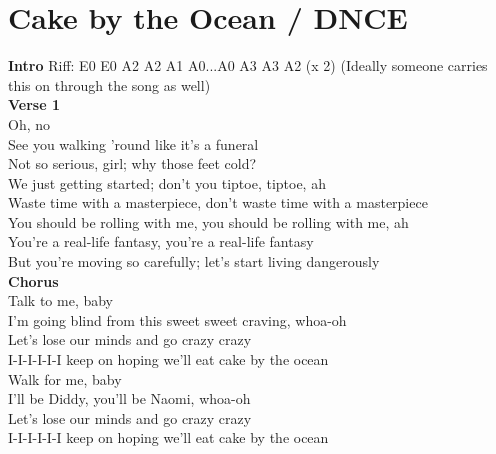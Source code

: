 \section{Cake by the Ocean / DNCE}\label{sec:cakebytheocean}

\Eminor
\Bminor
\Amajor
\Cmajor

\textbf{Intro} Riff: E0 E0 A2 A2 A1 A0...A0 A3 A3 A2 (x 2) (Ideally someone carries this on through the song as well)\\
\textbf{Verse 1}\\
Oh, no\\
See you walking 'round like it's a funeral\\
Not so serious, girl; why those feet cold?\\
We just getting started; don't you tiptoe, tiptoe, ah\\
Waste time with a masterpiece, don't waste time with a masterpiece\\
You should be rolling with me, you should be rolling with me, ah\\
You're a real-life fantasy, you're a real-life fantasy\\       
But you're moving so carefully; let's start living dangerously\\
\textbf{Chorus}\\
Talk to me, baby\\
I'm going blind from this sweet sweet craving, whoa-oh\\
Let's lose our minds and go crazy crazy\\
I-I-I-I-I-I keep on hoping we'll eat cake by the ocean\\
Walk for me, baby\\
I'll be Diddy,  you'll be Naomi, whoa-oh\\
Let's lose our minds and go crazy crazy\\
I-I-I-I-I-I keep on hoping we'll eat cake by the ocean\\
